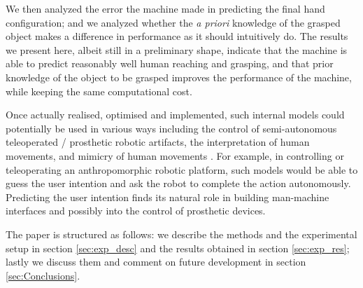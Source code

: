 We then analyzed the error the machine made in predicting the final
hand configuration; and we analyzed whether the \emph{a priori}
knowledge of the grasped object makes a difference in performance as
it should intuitively do. The results we present here, albeit still in
a preliminary shape, indicate that the machine is able to predict
reasonably well human reaching and grasping, and that prior knowledge
of the object to be grasped improves the performance of the machine,
while keeping the same computational cost.


Once actually realised, optimised and implemented, such internal
models could potentially be used in various ways including the control
of semi-autonomous teleoperated / prosthetic robotic artifacts, the
interpretation of human movements, and mimicry of human movements
\cite{wolpert-01}. For example, in controlling or teleoperating an
anthropomorphic robotic platform, such models would be able to guess
the user intention and ask the robot to complete the action
autonomously. Predicting the user intention finds its natural role in
building man-machine interfaces and possibly into the control of
prosthetic devices.

The paper is structured as follows: we describe the methods and the
experimental setup in section \ref{sec:exp_desc} and the results
obtained in section \ref{sec:exp_res}; lastly we discuss them and
comment on future development in section \ref{sec:Conclusions}.

